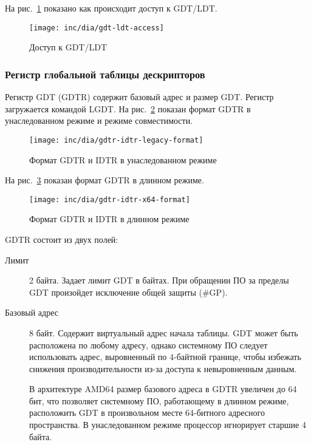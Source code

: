 На рис.~\ref{fig:gdt-ldt-access} показано как происходит доступ к GDT/LDT.

\begin{figure}[ht!]
  \centering
  \texttt{[image: inc/dia/gdt-ldt-access]}
  \caption{Доступ к GDT/LDT}
  \label{fig:gdt-ldt-access}
\end{figure}

\subsubsection*{Регистр глобальной таблицы дескрипторов}
Регистр GDT (GDTR) содержит базовый адрес и размер GDT. Регистр загружается командой LGDT.
На рис.~\ref{fig:gdtr-idtr-legacy-format} показан формат GDTR в унаследованном режиме и
режиме совместимости.

\begin{figure}[ht!]
  \centering
  \texttt{[image: inc/dia/gdtr-idtr-legacy-format]}
  \caption{Формат GDTR и IDTR в унаследованном режиме}
  \label{fig:gdtr-idtr-legacy-format}
\end{figure}

На рис.~\ref{fig:gdtr-idtr-x64-format} показан формат GDTR в длинном режиме.

\begin{figure}[ht!]
  \centering
  \texttt{[image: inc/dia/gdtr-idtr-x64-format]}
  \caption{Формат GDTR и IDTR в длинном режиме}
  \label{fig:gdtr-idtr-x64-format}
\end{figure}

GDTR состоит из двух полей:
\begin{description}
\item[Лимит] 2 байта. Задает лимит GDT в байтах. При обращении ПО за пределы GDT произойдет
	исключение общей защиты (\#GP).
\item[Базовый адрес] 8 байт. Содержит виртуальный адрес начала таблицы. GDT может быть расположена
	по любому адресу, однако системному ПО следует использовать адрес, выровненный по 4-байтной границе,
	чтобы избежать снижения производительности из-за доступа к невыровненным данным.

	В архитектуре AMD64 размер базового адреса в GDTR увеличен до 64 бит, что позволяет системному ПО,
	работающему в длинном режиме, расположить GDT в произвольном месте 64-битного адресного пространства.
	В унаследованном режиме процессор игнорирует старшие 4 байта.
\end{description}

